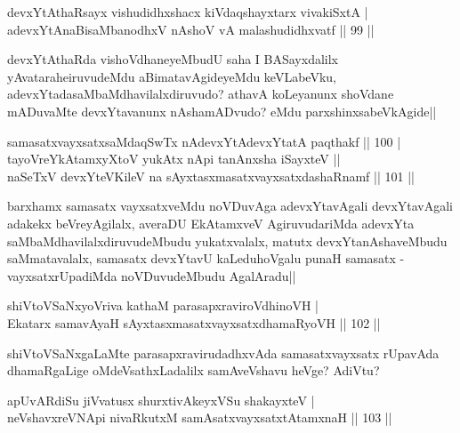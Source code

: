 
\begin{shl}
devxYtAthaRsayx vishudidhxshacx kiVdaqshayxtarx vivakiSxtA |\\
adevxYtAnaBisaMbanodhxV nAshoV vA malashudidhxvatf \hfill || 99 ||
\end{shl}

\begin{artha}
devxYtAthaRda vishoVdhaneyeMbudU saha I BASayxdalilx yAvataraheiruvudeMdu aBimatavAgideyeMdu keVLabeVku, adevxYtadasaMbaMdhavilalxdiruvudo? athavA koLeyanunx shoVdane mADuvaMte devxYtavanunx nAshamADvudo? eMdu parxshinxsabeVkAgide||
\end{artha}


\begin{shl}
samasatxvayxsatxsaMdaqSwTx nAdevxYtAdevxYtatA paqthakf \hfill || 100 |\\
tayoVreYkAtamxyXtoV yukAtx nApi tanAnxsha iSayxteV ||\\
naSeTxV devxYteV\s KileV na sAyxtasxmasatxvayxsatxdashaRnamf \hfill || 101 ||
\end{shl}

\begin{artha}
barxhamx samasatx vayxsatxveMdu noVDuvAga adevxYtavAgali devxYtavAgali adakekx beVreyAgilalx, averaDU EkAtamxveV AgiruvudariMda adevxYta saMbaMdhavilalxdiruvudeMbudu yukatxvalalx, matutx devxYtanAshaveMbudu saMmatavalalx, samasatx devxYtavU kaLeduhoVgalu punaH samasatx - vayxsatxrUpadiMda noVDuvudeMbudu AgalAradu||
\end{artha}


\begin{shl}
shiVtoVSaNxyoVriva kathaM parasapxraviroVdhinoVH |\\
Ekatarx samavAyaH sAyxtasxmasatxvayxsatxdhamaRyoVH \hfill || 102 ||
\end{shl}

\begin{artha}
shiVtoVSaNxgaLaMte parasapxravirudadhxvAda samasatxvayxsatx rUpavAda dhamaRgaLige oMdeVsathxLadalilx samAveVshavu heVge? AdiVtu? 
\end{artha}


\begin{shl}
apUvARdiSu jiVvatusx shurxtivAkeyxVSu shakayxteV |\\
neVshavxreVNApi nivaRkutxM samAsatxvayxsatxtA\s \s tamxnaH \hfill || 103 ||
\end{shl}

